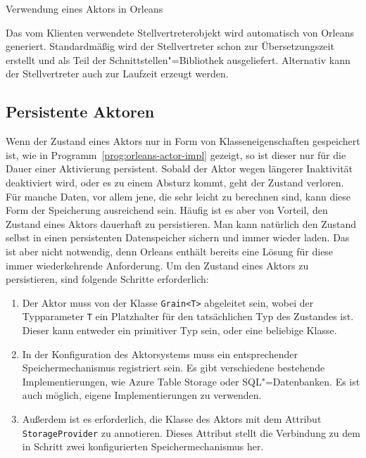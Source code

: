 \begin{program}[!hbt]
\caption{Verwendung eines Aktors in Orleans}
\label{prog:orleans-actor-client}
\end{program}

\iffalse $ \fi

Das vom Klienten verwendete Stellvertreterobjekt wird automatisch von Orleans generiert. Standardmäßig wird der Stellvertreter schon zur Übersetzungszeit erstellt und als Teil der Schnittstellen"=Bibliothek ausgeliefert. Alternativ kann der Stellvertreter auch zur Laufzeit erzeugt werden.

\subsection{Persistente Aktoren}

Wenn der Zustand eines Aktors nur in Form von Klasseneigenschaften gespeichert ist, wie in Programm~\ref{prog:orleans-actor-impl} gezeigt, so ist dieser nur für die Dauer einer Aktivierung persistent. Sobald der Aktor wegen längerer Inaktivität deaktiviert wird, oder es zu einem Absturz kommt, geht der Zustand verloren. Für manche Daten, vor allem jene, die sehr leicht zu berechnen sind, kann diese Form der Speicherung ausreichend sein. Häufig ist es aber von Vorteil, den Zustand eines Aktors dauerhaft zu persistieren. Man kann natürlich den Zustand selbst in einen persistenten Datenspeicher sichern und immer wieder laden. Das ist aber nicht notwendig, denn Orleans enthält bereits eine Lösung für diese immer wiederkehrende Anforderung. Um den Zustand eines Aktors zu persistieren, sind folgende Schritte erforderlich:

\begin{enumerate}
	\item Der Aktor muss von der Klasse \lstinline{Grain<T>} abgeleitet sein, wobei der Typ\-parameter \lstinline{T} ein Platzhalter für den tatsächlichen Typ des Zustandes ist. Dieser kann entweder ein primitiver Typ sein, oder eine beliebige Klasse.
	\item In der Konfiguration des Aktorsystems muss ein entsprechender Speichermechanismus registriert sein. Es gibt verschiedene bestehende Implementierungen, wie \zB Azure Table Storage oder SQL"=Datenbanken. Es ist auch möglich, eigene Implementierungen zu verwenden.
	\item Außerdem ist es erforderlich, die Klasse des Aktors mit dem Attribut \lstinline{StorageProvider} zu annotieren. Dieses Attribut stellt die Verbindung zu dem in Schritt zwei konfigurierten Speichermechanismus her.
\end{enumerate}

